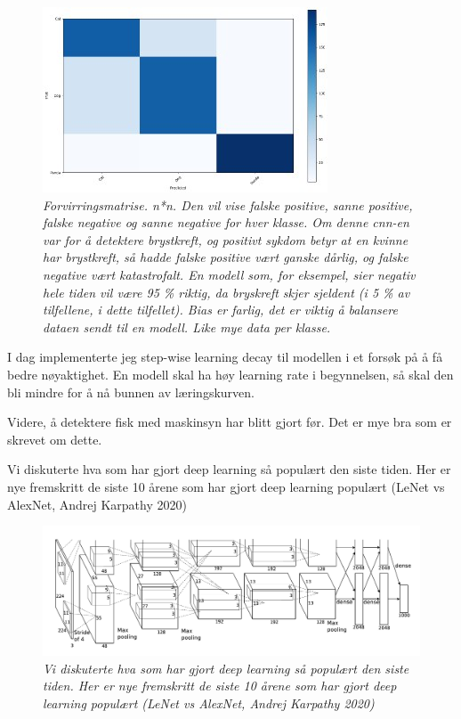 \begin{figure} 
\begin{center} 
\includegraphics{figures/confusion_matrix}
\caption{\small \sl Forvirringsmatrise. n*n. Den vil vise falske positive, sanne positive, falske negative og sanne negative for hver klasse. Om denne cnn-en var for å detektere brystkreft, og positivt sykdom betyr at en kvinne har brystkreft, så hadde falske positive vært ganske dårlig, og falske negative vært katastrofalt. En modell som, for eksempel, sier negativ hele tiden vil være 95 \% riktig, da bryskreft skjer sjeldent (i 5 \% av tilfellene, i dette tilfellet). Bias er farlig, det er viktig å balansere dataen sendt til en modell. Like mye data per klasse. \label{fig:datapoints}}
\end{center} 
\end{figure} 

I dag implementerte jeg step-wise learning decay til modellen i et forsøk på å få bedre nøyaktighet. En modell skal ha høy learning rate i begynnelsen, så skal den bli mindre for å nå bunnen av læringskurven.

Videre, å detektere fisk med maskinsyn har blitt gjort før. Det er mye bra som er skrevet om dette.

Vi diskuterte hva som har gjort deep learning så populært den siste tiden. Her er nye fremskritt de siste 10 årene som har gjort deep learning populært (LeNet vs AlexNet, Andrej Karpathy 2020)

\begin{figure} 
\begin{center} 
\includegraphics{figures/alexnet}
\caption{\small \sl Vi diskuterte hva som har gjort deep learning så populært den siste tiden. Her er nye fremskritt de siste 10 årene som har gjort deep learning populært (LeNet vs AlexNet, Andrej Karpathy 2020) \label{fig:datapoints}}
\end{center} 
\end{figure} 


